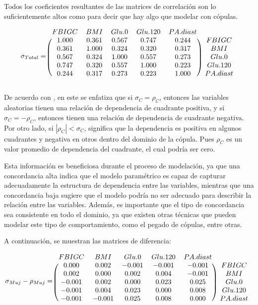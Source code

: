 Todos los coeficientes resultantes de las matrices de correlación son lo suficientemente altos como para decir que hay algo que modelar con cópulas.

\[
\sigma_{Total} = \begin{blockarray}{cccccc}
FBIGC      &      BMI      &    Glu.0      &  Glu.120      & PA.diast \\
\begin{block}{(ccccc)c}
1.000 & 0.361 & 0.567 & 0.747 & 0.244 & FBIGC \\
0.361 & 1.000 & 0.324 & 0.320 & 0.317 & BMI \\
0.567 & 0.324 & 1.000 & 0.557 & 0.273 & Glu.0 \\
0.747 & 0.320 & 0.557 & 1.000 & 0.223 & Glu.120 \\
0.244 & 0.317 & 0.273 & 0.223 & 1.000 & PA.diast \\
\end{block}
\end{blockarray}
 \]


De acuerdo con \cite{Erdely2022}, en este se enfatiza que si $\sigma_{C} = \rho_{C}$, entonces las variables aleatorias tienen una relación de dependencia de cuadrante positiva, y si $\sigma_{C} = -\rho_{C}$, entonces tienen una relación de dependencia de cuadrante negativa. Por otro lado, si $ |\rho_C| < \sigma_C$, significa que la dependencia es positiva en algunos cuadrantes y negativa en otros dentro del dominio de la cópula. Pues $\rho_{C}$ es un valor promedio de dependencia del cuadrante, el cual podría ser cero.


Esta información es beneficiosa durante el proceso de modelación, ya que una concordancia alta indica que el modelo paramétrico es capaz de capturar adecuadamente la estructura de dependencia entre las variables, mientras que una concordancia baja sugiere que el modelo podría no ser adecuado para describir la relación entre las variables. Además, es importante que el tipo de concordancia sea consistente en todo el dominio, ya que existen otras técnicas que pueden modelar este tipo de comportamiento, como el pegado de cópulas, entre otras.

A continuación, se muestran las matrices de diferencia:


\[
\sigma_{Muj} - \rho_{Muj} = \begin{blockarray}{cccccc}
FBIGC      &      BMI      &    Glu.0      &  Glu.120      & PA.diast \\
\begin{block}{(ccccc)c}
  0.000 & 0.002 & -0.001 & -0.001  & -0.001 & FBIGC \\
  0.002 & 0.000 &  0.002 &  0.004  & -0.001 & BMI \\
 -0.001 & 0.002 &  0.000 &  0.023  &  0.025 & Glu.0 \\
 -0.001 & 0.004 &  0.023 &  0.000  &  0.008 & Glu.120 \\
 -0.001 &-0.001 &  0.025 &  0.008  &  0.000 & PA.diast \\
\end{block}
\end{blockarray}
 \]

